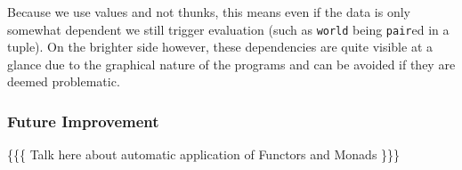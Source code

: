 \documentclass[12pt,UTF8,a4]{article}
\newcommand{\code}[1]{\texttt{#1}}
\newcommand{\type}[1]{\texttt{#1}}
\begin{document}
Because we use values and not thunks, this means even if the data is
only somewhat dependent we still trigger evaluation (such as
\type{world} being \code{pair}ed in a tuple). On the brighter side
however, these dependencies are quite visible at a glance due to the
graphical nature of the programs and can be avoided if they are deemed
problematic.

\subsubsection{Future Improvement}
\{\{\{ Talk here about automatic application of Functors and Monads \}\}\}
\end{document}
